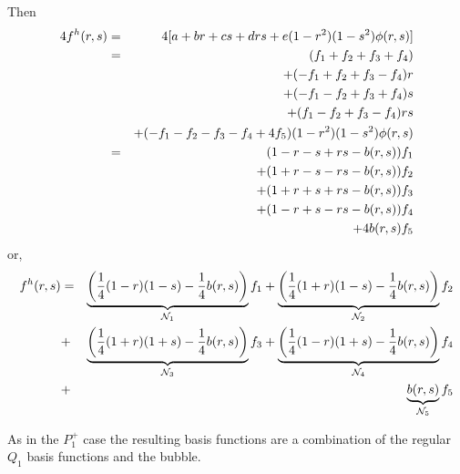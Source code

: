 Then 
\begin{eqnarray}
4f^h(r,s)
&=&4 [a+br+cs+drs+e (1-r^2) (1-s^2) \phi(r,s)] \nonumber\\
&=&  (f_1 + f_2 +f_3 +f_4) \nonumber\\
&&+ (-f_1 + f_2 +f_3 -f_4)r \nonumber\\
&&+(-f_1 - f_2 +f_3 +f_4)s \nonumber\\
&&+ (f_1 - f_2 +f_3 -f_4)rs \nonumber\\
&&+ (-f_1 - f_2 -f_3 -f_4 + 4f_5) (1-r^2) (1-s^2) \phi(r,s) \nonumber\\
&=& (1-r-s+rs - b(r,s))f_1 \nonumber\\
&&+ (1+r-s-rs-b(r,s))f_2 \nonumber\\
&&+ (1+r+s+rs-b(r,s))f_3 \nonumber\\
&&+ (1-r+s-rs- b(r,s))f_4 \nonumber\\
&&+ 4b(r,s) f_5
\end{eqnarray}
or, 
\begin{eqnarray}
f^h(r,s)&=&
\underbrace{\left(\frac{1}{4}(1-r)(1-s)-\frac{1}{4}b(r,s)\right)}_{{\mathcal{N}}_1} f_1 + 
\underbrace{\left(\frac{1}{4}(1+r)(1-s)-\frac{1}{4}b(r,s)\right)}_{{\mathcal{N}}_2} f_2\\
&+& 
\underbrace{\left(\frac{1}{4}(1+r)(1+s)-\frac{1}{4}b(r,s)\right)}_{{\mathcal{N}}_3} f_3 +
\underbrace{\left(\frac{1}{4}(1-r)(1+s)-\frac{1}{4}b(r,s)\right)}_{{\mathcal{N}}_4} f_4 \\
&+& \underbrace{b(r,s)}_{{\mathcal{N}}_5} f_5
\end{eqnarray}

As in the $P_1^+$ case the resulting basis functions are a combination 
of the regular $Q_1$ basis functions and the bubble.

